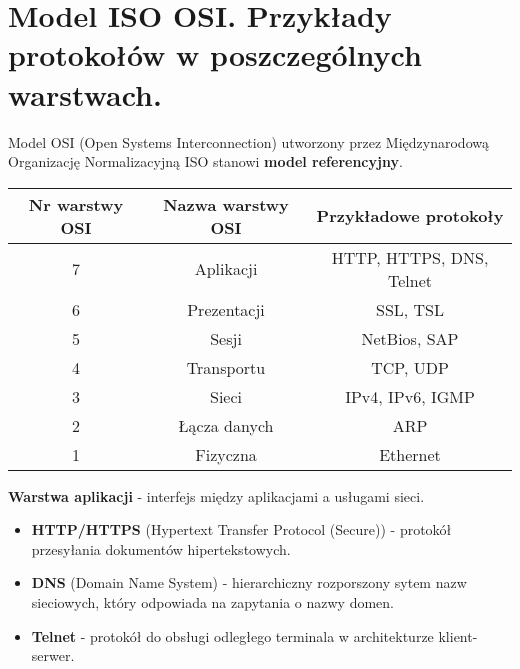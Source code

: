 \documentclass[main.tex]{subfiles}
\begin{document}
    \newpage

    \section{Model ISO OSI. Przykłady protokołów w poszczególnych warstwach.}
    Model OSI (Open Systems Interconnection) utworzony przez Międzynarodową Organizację Normalizacyjną ISO stanowi
    \textbf{model referencyjny}.

    \begin{table}[H]
        \begin{center}
            \begin{tabular}{|c|c|c| }
                \hline
                \textbf{Nr warstwy OSI} & \textbf{Nazwa warstwy OSI} & \textbf{Przykładowe protokoły}\\
                \hline
                \hline
                7 & Aplikacji & HTTP, HTTPS, DNS, Telnet\\
                \hline
                6 & Prezentacji & SSL, TSL\\
                \hline
                5 & Sesji & NetBios, SAP\\
                \hline
                4 & Transportu & TCP, UDP\\
                \hline
                3 & Sieci & IPv4, IPv6, IGMP\\
                \hline
                2 & Łącza danych & ARP\\
                \hline
                1 & Fizyczna & Ethernet\\
                \hline
            \end{tabular}
        \end{center}
    \end{table}

    \noindent \textbf{Warstwa aplikacji} - interfejs między aplikacjami a
    usługami sieci.
    \begin{itemize}
        \item \textbf{HTTP/HTTPS} (Hypertext Transfer Protocol (Secure)) - protokół przesyłania dokumentów hipertekstowych.
        \item \textbf{DNS} (Domain Name System) - hierarchiczny rozporszony sytem nazw sieciowych, który odpowiada na zapytania
        o nazwy domen.
        \item \textbf{Telnet} - protokół do obsługi odległego terminala w architekturze klient-serwer.
    \end{itemize}
\end{document}
